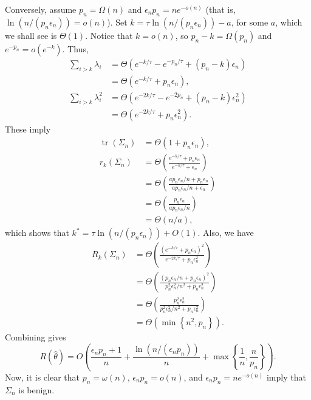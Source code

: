 \documentclass[11pt,notitlepage]{article}
\newcommand\tr {\ensuremath{\operatorname{\mathrm{tr}}}}
\begin{document}
Conversely, assume $p_n=\Omega(n)$ and
$\epsilon_np_n=ne^{-o(n)}$ (that is, $\ln(n/(p_n\epsilon_n))=o(n)$).
Set $k=\tau\ln(n/(p_n\epsilon_n))-a$,
for some $a$, which we shall see is $\Theta(1)$. Notice that
$k=o(n)$, so $p_n-k=\Omega(p_n)$ and $e^{-p_n}=o(e^{-k})$. Thus,
  \begin{align*}
    \sum_{i>k}\lambda_i
      & = \Theta\left(e^{-k/\tau}-e^{-p_n/\tau}
        + (p_n-k)\epsilon_n\right) \\
      & = \Theta\left(e^{-k/\tau} + p_n\epsilon_n\right), \\
    \sum_{i>k}\lambda_i^2
      & = \Theta\left(e^{-2k/\tau}-e^{-2p_n}
        + (p_n-k)\epsilon_n^2\right) \\
      & = \Theta\left(e^{-2k/\tau} + p_n\epsilon_n^2\right).
  \end{align*}
These imply
  \begin{align*}
    \tr(\Sigma_n)
      & = \Theta(1+p_n\epsilon_n), \\
    r_k(\Sigma_n)
      & = \Theta\left(
        \frac{e^{-k/\tau}+p_n\epsilon_n}{e^{-k/\tau}+\epsilon_n}\right) \\
      & = \Theta\left(
        \frac{ap_n\epsilon_n/n + p_n\epsilon_n}
        {ap_n\epsilon_n/n + \epsilon_n}\right) \\
      & = \Theta\left(
        \frac{p_n\epsilon_n}
        {ap_n\epsilon_n/n}\right) \\
      & = \Theta\left(n/a\right),
  \end{align*}
which shows that $k^*=\tau\ln(n/(p_n\epsilon_n))+O(1)$.
Also, we have
  \begin{align*}
    R_k(\Sigma_n)
      & = \Theta\left(
        \frac{\left(e^{-k/\tau}+p_n\epsilon_n\right)^2}
        {e^{-2k/\tau}+p_n\epsilon_n^2}\right) \\
      & = \Theta\left(
        \frac{\left(p_n\epsilon_n/n+p_n\epsilon_n\right)^2}
        {p_n^2\epsilon_n^2/n^2+p_n\epsilon_n^2}\right) \\
      & = \Theta\left(\frac{p_n^2\epsilon_n^2}
        {p_n^2\epsilon_n^2/n^2+p_n\epsilon_n^2}\right) \\
      & = \Theta\left(\min\left\{n^2,p_n \right\}\right).
  \end{align*}
Combining gives
  \[
    R(\hat\theta)
      = O\left(\frac{\epsilon_np_n+1}{n}
      + \frac{\ln(n/(\epsilon_np_n))}{n}
      + \max\left\{\frac{1}{n},\frac{n}{p_n}\right\}\right).
  \]
Now, it is clear that $p_n=\omega(n)$, $\epsilon_np_n=o(n)$, and
$\epsilon_np_n=ne^{-o(n)}$ imply that $\Sigma_n$ is benign.
\end{document}
